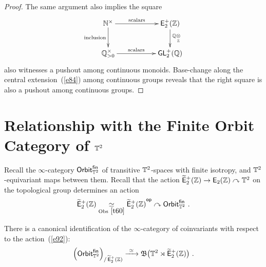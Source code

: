 \begin{proof}
The same argument also implies the square
\[
\xymatrix{
\NN^\times
\ar[rr]^-{\rm scalars}
\ar[d]_-{\rm inclusion}
&&
\EpZ 
\ar[d]^-{\QQ\underset{\ZZ}\ot}
\\
\QQ_{>0}^\times
\ar[rr]^-{\rm scalars}
&&
\GL_2^+(\QQ)
}
\]
also witnesses a pushout among continuous monoids.
Base-change along the central extension~(\ref{e84}) among continuous groups
reveals that the right square is also a pushout among continuous groups.

\end{proof}





\section{Relationship with the Finite Orbit Category of $\mathbb T^2$}
Recall the $\infty$-category ${\sf Orbit}_{\mathbb T^2}^{\sf fin}$ of transitive $\mathbb T^2$-spaces with finite isotropy, and $\mathbb T^2$-equivariant maps between them. 
Recall that the action $\operatorname{\widetilde{\sf E}_{2}^{+}(\mathbb Z)} \to \operatorname{\mathsf E_2(\mathbb Z)} \curvearrowright \mathbb T^2$ on the topological group determines an action 
\begin{equation}
\label{e92}
\operatorname{\widetilde{\sf E}_{2}^{+}(\mathbb Z)} \underset{\rm Obs~\ref{t60}}\simeq \operatorname{\widetilde{\sf E}_{2}^{+}(\mathbb Z)}^{\operatorname{\mathsf{op}}} \curvearrowright {\sf Orbit}^{\sf fin}_{\mathbb T^2}
~.
\end{equation}



\begin{prop}
\label{t68}
There is a canonical identification of the $\infty$-category of coinvariants with respect to the action~(\ref{e92}): 
\[
\Bigl(
{\sf Orbit}^{\sf fin}_{\mathbb T^2}
\Bigr)_{/\operatorname{\widetilde{\sf E}_{2}^{+}(\mathbb Z)}}
\xrightarrow{~\simeq~}
\mathfrak B \bigl(
\mathbb T^2 \rtimes \operatorname{\widetilde{\sf E}_{2}^{+}(\mathbb Z)}
\bigr)
~.
\]

\end{prop}

